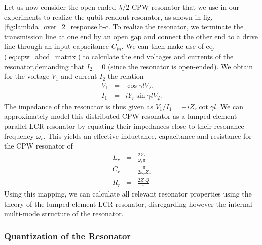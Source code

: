 Let us now consider the open-ended $\lambda / 2$ CPW resonator that we use in our experiments to realize the qubit readout resonator, as shown in fig. \ref{fig:lambda_over_2_response}b-c. To realize the resonator, we terminate the transmission line at one end by an open gap and connect the other end to a drive line through an input capacitance $C_{in}$. We can then make use of eq. (\ref{eq:cpw_abcd_matrix}) to calculate the end voltages and currents of the resonator,demanding that $I_2=0$ (since the resonator is open-ended). We obtain for the voltage $V_1$ and current $I_2$ the relation
%
\begin{eqnarray}
V_1 & = & \cos{\gamma l} V_2, \\
I_1 & = & i Y_r \sin{\gamma l} V_2.
\end{eqnarray}
%
The impedance of the resonator is thus given as $V_1/I_1 = -i Z_r \cot{\gamma l}$. We can approximately model this distributed CPW resonator as a lumped element parallel LCR resonator by equating their impedances close to their resonance frequency $\omega_r$. This yields an effective inductance, capacitance and resistance for the CPW resonator of
%
\begin{eqnarray}
L_{r} & = & \frac{2 Z_r}{\omega_r \pi} \\
C_{r} & = & \frac{\pi}{2\omega_r Z_r} \\
R_{r} & = & \frac{2 Z_r Q}{\pi}
\end{eqnarray}
%
Using this mapping, we can calculate all relevant resonator properties using the theory of the lumped element LCR resonator, disregarding however the internal multi-mode structure of the resonator.

\subsubsection{Quantization of the Resonator}


